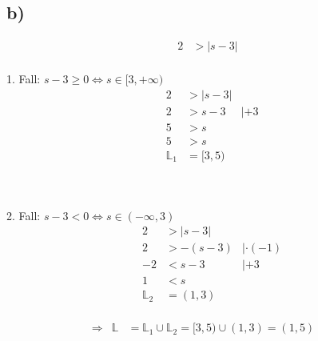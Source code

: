 \documentclass[]{article}
\newcommand{\eq}{\Leftrightarrow}
\newcommand{\rarr}{\Rightarrow}
\begin{document}
\subsection*{b)}
\begin{align*}
	&& 2 &> |s-3|&&\\
\end{align*}
\begin{center}\begin{minipage}{0.45\textwidth}
	1. Fall: $s-3 \geq 0 \eq s \in [3, +\infty)$
	\begin{align*}
		&& 2 &> |s-3|&&\\
		&& 2 &> s-3&|+3&\\
		&& 5 &> s&&\\
		&& 5 &> s&&\\
		&& \mathbb{L}_1&= [3,5)&&\\
	\end{align*}
\end{minipage} ~\vline~ \begin{minipage}{0.45\textwidth}
	2. Fall: $s-3 < 0 \eq s \in (-\infty,3)$
	\begin{align*}
		&& 2 &> |s-3|&&\\
		&& 2 &> -(s-3)&|\cdot (-1)&\\
		&& -2 &< s-3&|+3&\\
		&& 1 &< s&&\\
		&& \mathbb{L}_2&= (1,3)&&\\
	\end{align*}
\end{minipage}\end{center}
\begin{align*}
	&\rarr& \mathbb{L}&= \mathbb{L}_1 \cup \mathbb{L}_2 = [3,5) \cup (1,3) = (1,5)&&\\
\end{align*}
\end{document}
